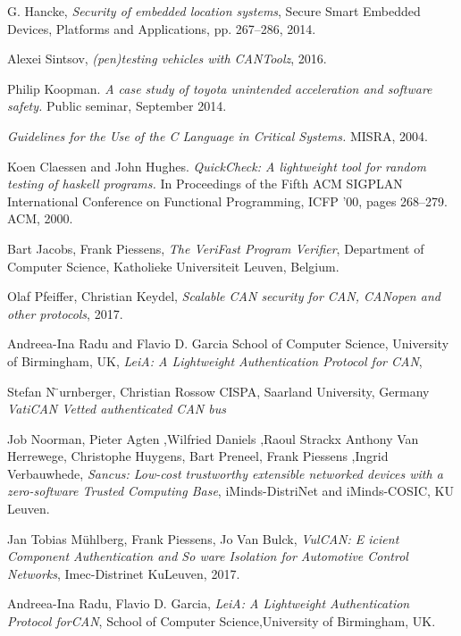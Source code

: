 \documentclass[11pt]{article}
\begin{document}
\begin{thebibliography}{10}
	G. Hancke, \textit{Security of embedded location systems}, Secure Smart Embedded Devices, Platforms and Applications, pp. 267–286, 2014.
	
	Alexei Sintsov, 
	\textit{(pen)testing vehicles with CANToolz},
	2016.
	
	Philip Koopman. \textit{A case study of toyota unintended acceleration and software safety.} Public seminar, September 2014.
	
	\textit{Guidelines for the Use of the C Language in Critical Systems.} MISRA, 2004.
	
	Koen Claessen and John Hughes. 
	\textit{QuickCheck: A lightweight tool for random testing of haskell programs.} In Proceedings of the Fifth ACM SIGPLAN International Conference on Functional Programming, ICFP ’00, pages 268–279. ACM, 2000.
	
	Bart Jacobs, Frank Piessens,
	\textit{The VeriFast Program Verifier}, Department of Computer Science, Katholieke Universiteit Leuven, Belgium.
	
	Olaf Pfeiffer, Christian Keydel, 
	\textit{Scalable CAN security for CAN, CANopen and other protocols}, 2017.
	
	Andreea-Ina Radu and Flavio D. Garcia
	School of Computer Science,
	University of Birmingham, UK, 
	\textit{LeiA: A Lightweight Authentication Protocol for CAN},
	
	Stefan N ̈urnberger, Christian Rossow
	CISPA, Saarland University, Germany
	\textit{VatiCAN Vetted authenticated CAN bus}
	
	Job Noorman, Pieter Agten ,Wilfried Daniels ,Raoul Strackx
	Anthony Van Herrewege, Christophe Huygens, Bart Preneel, Frank Piessens
    ,Ingrid Verbauwhede, \textit{Sancus: Low-cost trustworthy extensible networked devices with a zero-software Trusted Computing Base}, iMinds-DistriNet and iMinds-COSIC, KU Leuven.
    
    Jan Tobias Mühlberg, Frank Piessens, Jo Van Bulck,
    \textit{VulCAN: E icient Component Authentication and So ware Isolation for Automotive Control Networks}, Imec-Distrinet KuLeuven, 2017.
    
    Andreea-Ina Radu, Flavio D. Garcia,
    \textit{LeiA: A Lightweight Authentication Protocol forCAN},
    School of Computer Science,University of Birmingham, UK.
    

\end{thebibliography}
\end{document}
